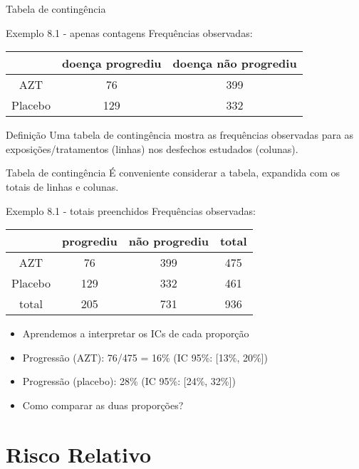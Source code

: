 \documentclass{beamer}
\begin{document}
\begin{frame}{\scriptsize Tabela de contingência}
  \begin{exampleblock}{Exemplo 8.1 - apenas contagens}
    Frequências observadas:
    \begin{tabular}{c|c|c}
      & doença progrediu & doença não progrediu\\
      \hline
      AZT & 76 & 399 \\
      \hline
      Placebo & 129 & 332 \\
    \end{tabular}
  \end{exampleblock}
  \begin{block}{Definição}
    \footnotesize
    Uma \alert{tabela de contingência} mostra as frequências
    observadas para as exposições/tratamentos (linhas) nos desfechos estudados (colunas).
  \end{block}
\end{frame}

\begin{frame}{\scriptsize Tabela de contingência}
  É conveniente considerar a tabela, expandida com os totais de linhas e colunas.
    \begin{exampleblock}{Exemplo 8.1 - totais preenchidos}
    Frequências observadas:
    \begin{tabular}{c|c|c|c}
      & progrediu & não progrediu & total\\
      \hline
      AZT & 76 & 399 & 475\\
      \hline
      Placebo & 129 & 332 & 461\\
      \hline
      total & 205 & 731 & 936\\
    \end{tabular}
  \end{exampleblock}
  \begin{itemize}
  \item Aprendemos a interpretar os ICs de cada proporção
  \item Progressão (AZT): 76/475 = 16\% (IC 95\%: [13\%, 20\%])
  \item Progressão (placebo): 28\% (IC 95\%: [24\%, 32\%])
  \item Como comparar as duas proporções?
  \end{itemize}
\end{frame}

\section{Risco Relativo}
\end{document}
